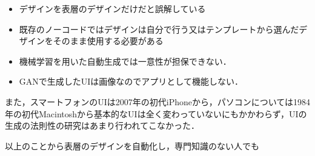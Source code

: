 \begin{itemize}
	\item デザインを表層のデザインだけだと誤解している %
	\item 既存のノーコードではデザインは自分で行う又はテンプレートから選んだデザインをそのまま使用する必要がある
	\item 機械学習を用いた自動生成では一意性が担保できない．
	\item GANで生成したUIは画像なのでアプリとして機能しない．
\end{itemize}
また，スマートフォンのUIは2007年の初代iPhoneから，パソコンについては1984年の初代Macintoshから基本的なUIは全く変わっていないにもかかわらず，UIの生成の法則性の研究はあまり行われてこなかった．


以上のことから表層のデザインを自動化し，専門知識のない人でも
